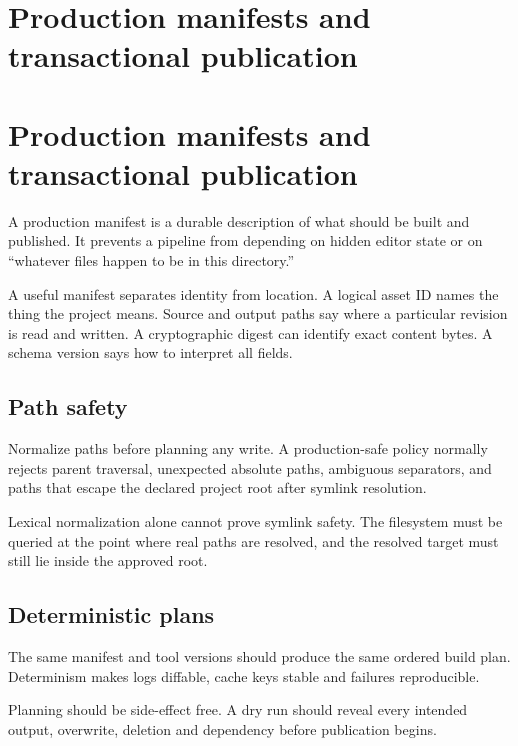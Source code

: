 \hypertarget{appendix-91eaa3cbdbc3}{}
\section*{Production manifests and transactional publication}
\section{Production manifests and transactional publication}\label{appendix-91eaa3cbdbc3-production-manifests-and-transactional-publication}

A production manifest is a durable description of what should be built and published. It prevents a pipeline from depending on hidden editor state or on ``whatever files happen to be in this directory.''

A useful manifest separates identity from location. A logical asset ID names the thing the project means. Source and output paths say where a particular revision is read and written. A cryptographic digest can identify exact content bytes. A schema version says how to interpret all fields.

\subsection{Path safety}\label{appendix-91eaa3cbdbc3-path-safety}

Normalize paths before planning any write. A production-safe policy normally rejects parent traversal, unexpected absolute paths, ambiguous separators, and paths that escape the declared project root after symlink resolution.

Lexical normalization alone cannot prove symlink safety. The filesystem must be queried at the point where real paths are resolved, and the resolved target must still lie inside the approved root.

\subsection{Deterministic plans}\label{appendix-91eaa3cbdbc3-deterministic-plans}

The same manifest and tool versions should produce the same ordered build plan. Determinism makes logs diffable, cache keys stable and failures reproducible.

Planning should be side-effect free. A dry run should reveal every intended output, overwrite, deletion and dependency before publication begins.

